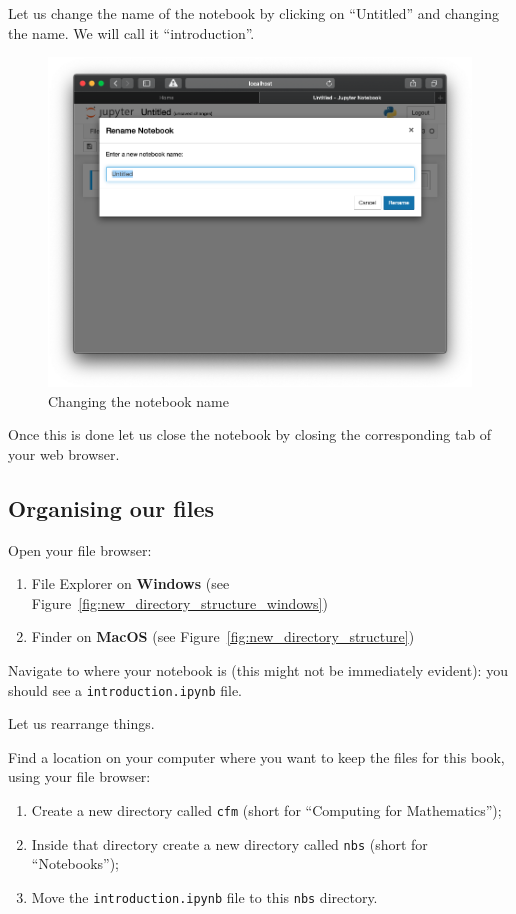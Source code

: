Let us change the name of the notebook by clicking on “Untitled” and changing
the name. We will call it “introduction”.

\begin{figure}[htbp]
\centering
    \includegraphics[width=0.750\linewidth]{assets/changing_notebook_name/main.png}
    \caption{Changing the notebook name}
\end{figure}

Once this is done let us close the notebook by closing the corresponding tab of your web browser.

\subsection{Organising our files}

Open your file browser:
\begin{enumerate}
    \item File Explorer on \textbf{Windows} (see
        Figure~\ref{fig:new_directory_structure_windows})

\item Finder on \textbf{MacOS} (see
        Figure~\ref{fig:new_directory_structure})
\end{enumerate}

Navigate to where your notebook is (this might not be immediately evident): you
should see a \texttt{introduction.ipynb} file.

Let us rearrange things.

Find a location on your computer where you want to keep the files for this
book, using your file browser:

\begin{enumerate}
\item Create a new directory called \texttt{cfm} (short for “Computing for Mathematics”);

\item Inside that directory create a new directory called \texttt{nbs} (short for
``Notebooks'');

\item Move the \texttt{introduction.ipynb} file to this \texttt{nbs} directory.

\end{enumerate}


